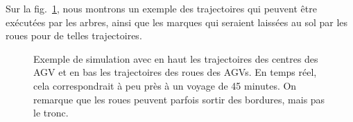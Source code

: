 \documentclass[french,A4paper,]{book}
\begin{document}
Sur la fig.~\ref{fig:simus}, nous montrons un exemple des trajectoires
qui peuvent être exécutées par les arbres, ainsi que les marques qui
seraient laissées au sol par les roues pour de telles trajectoires.

\begin{figure}
\centering

\hspace*{\fill}
\hspace*{\fill}

\hspace*{\fill}
\hspace*{\fill}

\caption{Exemple de simulation avec en haut les trajectoires des centres
des AGV et en bas les trajectoires des roues des AGVs. En temps réel,
cela correspondrait à peu près à un voyage de 45 minutes. On remarque
que les roues peuvent parfois sortir des bordures, mais pas le tronc.}

\label{fig:simus}

\end{figure}
\end{document}
